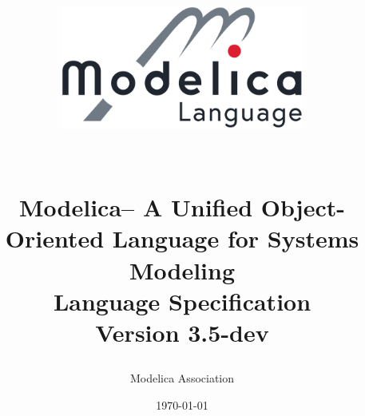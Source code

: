 \newenvironment{contributors}{%
\list{}{%
\setlength{\leftmargin}{1.5em}%
\setlength{\itemsep}{-\parskip}%
\addtolength{\itemsep}{2pt}%
}%
}{%
\endlist
}

\title{
\ifpdf
\begin{center}
\includegraphics[width=8cm]{Modelica_Language}
\end{center}
~\\[2\baselineskip]
\fi
Modelica\textsuperscript\textregistered -- A Unified Object-Oriented Language for Systems
Modeling\\[2\baselineskip]
Language Specification\\[2\baselineskip]
Version 3.5-dev}
\date{\today}
\author{Modelica Association}
